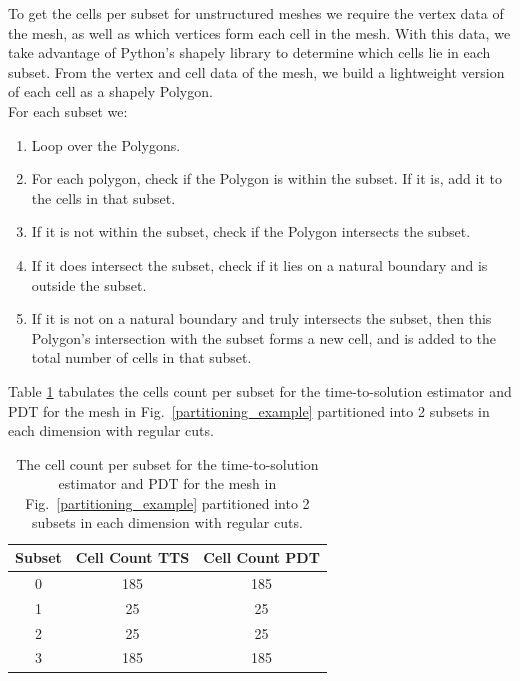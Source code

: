 \documentclass[times,final]{elsarticle}
\begin{document}
To get the cells per subset for unstructured meshes we require the vertex data of the mesh, as well as which vertices form each cell in the mesh.
With this data, we take advantage of Python's shapely library \cite{shapely} to determine which cells lie in each subset. From the vertex and cell data of the mesh, we build a lightweight version of each cell as a shapely Polygon.\\
\noindent
For each subset we:
\begin{enumerate}
  \item Loop over the Polygons.
  \item For each polygon, check if the Polygon is within the subset. If it is, add it to the cells in that subset.
  \item If it is not within the subset, check if the Polygon intersects the subset.
  \item If it does intersect the subset, check if it lies on a natural boundary and is outside the subset.
  \item If it is not on a natural boundary and truly intersects the subset, then this Polygon's intersection with the subset forms a new cell,  and is added to the total number of cells in that subset.
\end{enumerate}
Table \ref{2x2_cellcount} tabulates the cells count per subset for the time-to-solution estimator and PDT for the mesh in Fig.~\ref{partitioning_example} partitioned into 2 subsets in each dimension with regular cuts.
\begin{table}[H]
\centering
\caption{The cell count per subset for the time-to-solution estimator and PDT for the mesh in Fig.~\ref{partitioning_example} partitioned into 2 subsets in each dimension with regular cuts.}
\label{2x2_cellcount}
\begin{tabular}{c|c|c}
\textbf{Subset} & \textbf{Cell Count TTS} & \textbf{Cell Count PDT} \\ \hline
0 & 185 & 185 \\ \hline
1 & 25 & 25 \\ \hline
2 & 25 & 25 \\ \hline
3 & 185 & 185
\end{tabular}
\end{table}
\end{document}
